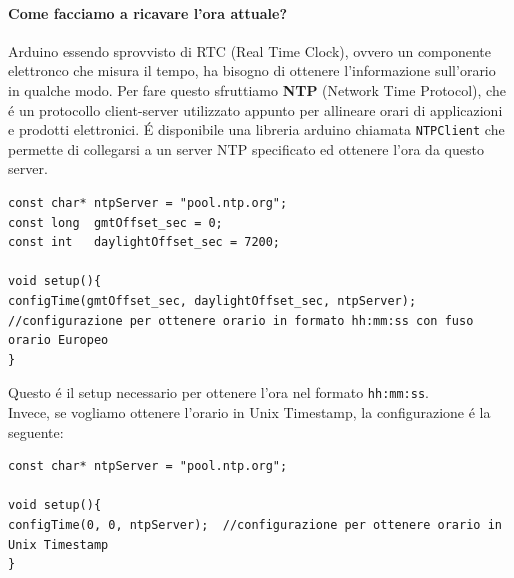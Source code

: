 \paragraph{Come facciamo a ricavare l'ora attuale?\\}
Arduino essendo sprovvisto di RTC (Real Time Clock), ovvero un componente elettronco che misura il tempo, ha bisogno di ottenere l'informazione
sull'orario in qualche modo.
Per fare questo sfruttiamo \textbf{NTP} (Network Time Protocol), che é un protocollo client-server utilizzato appunto per allineare orari di applicazioni
e prodotti elettronici.
É disponibile una libreria arduino chiamata \texttt{NTPClient} che permette di collegarsi a un server NTP specificato ed ottenere
l'ora da questo server.

\begin{lstlisting}[autogobble]
const char* ntpServer = "pool.ntp.org";
const long  gmtOffset_sec = 0;
const int   daylightOffset_sec = 7200;

void setup(){
configTime(gmtOffset_sec, daylightOffset_sec, ntpServer);  //configurazione per ottenere orario in formato hh:mm:ss con fuso orario Europeo
}
\end{lstlisting}

Questo é il setup necessario per ottenere l'ora nel formato \texttt{hh:mm:ss}.\\

Invece, se vogliamo ottenere l'orario in Unix Timestamp, la configurazione é la seguente:
\begin{lstlisting}[autogobble]
const char* ntpServer = "pool.ntp.org";

void setup(){
configTime(0, 0, ntpServer);  //configurazione per ottenere orario in Unix Timestamp
}
\end{lstlisting}

